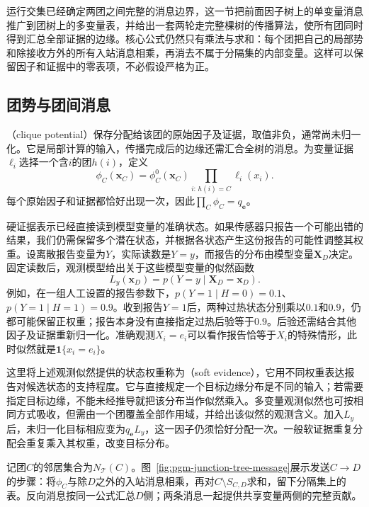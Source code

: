 运行交集已经确定两团之间完整的消息边界，这一节把前面因子树上的单变量消息推广到团树上的多变量表，并给出一套两轮走完整棵树的传播算法，使所有团同时得到汇总全部证据的边缘。核心公式仍然只有乘法与求和：每个团把自己的局部势和除接收方外的所有入站消息相乘，再消去不属于分隔集的内部变量。这样可以保留因子和证据中的零表项，不必假设严格为正。

\subsection{团势与团间消息}
\label{sec:pgm-junction-tree-clique-messages}

（clique potential）保存分配给该团的原始因子及证据，取值非负，通常尚未归一化。它是局部计算的输入，传播完成后的边缘还需汇合全树的消息。为变量证据$\ell_i$选择一个含$i$的团$h(i)$，定义
\begin{equation}
  \phi_C(\bm{x}_C)=\phi_C^0(\bm{x}_C)
    \prod_{i:\,h(i)=C}\ell_i(x_i).
  \label{eq:pgm-junction-tree-local-evidence}
\end{equation}
每个原始因子和证据都恰好出现一次，因此$\prod_C\phi_C=q_{\bm e}$。

硬证据表示已经直接读到模型变量的准确状态。如果传感器只报告一个可能出错的结果，我们仍需保留多个潜在状态，并根据各状态产生这份报告的可能性调整其权重。设离散报告变量为$Y$，实际读数是$Y=y$，而报告的分布由模型变量$\bm X_D$决定。固定读数后，观测模型给出关于这些模型变量的似然函数
\begin{equation}
  L_y(\bm x_D)=p(Y=y\mid\bm X_D=\bm x_D).
  \label{eq:pgm-junction-tree-observation-likelihood}
\end{equation}
例如，在一组人工设置的报告参数下，$p(Y=1\mid H=0)=0.1$、$p(Y=1\mid H=1)=0.9$。收到报告$Y=1$后，两种过热状态分别乘以$0.1$和$0.9$，仍都可能保留正权重；报告本身没有直接指定过热后验等于$0.9$。后验还需结合其他因子及证据重新归一化。准确观测$X_i=e_i$可以看作报告恰等于$X_i$的特殊情形，此时似然就是$\mathbf1\{x_i=e_i\}$。

这里将上述观测似然提供的状态权重称为（soft evidence），它用不同权重表达报告对候选状态的支持程度。它与直接规定一个目标边缘分布是不同的输入；若需要指定目标边缘，不能未经推导就把该分布当作似然乘入。多变量观测似然也可按相同方式吸收，但需由一个团覆盖全部作用域，并给出该似然的观测含义。加入$L_y$后，未归一化目标相应变为$q_{\bm e}L_y$，这一因子仍须恰好分配一次。一般软证据重复分配会重复乘入其权重，改变目标分布。

记团$C$的邻居集合为$N_{\mathcal T}(C)$。图~\ref{fig:pgm-junction-tree-message}展示发送$C\to D$的步骤：将$\phi_C$与除$D$之外的入站消息相乘，再对$C\setminus S_{C,D}$求和，留下分隔集上的表。反向消息按同一公式汇总$D$侧；两条消息一起提供共享变量两侧的完整贡献。

